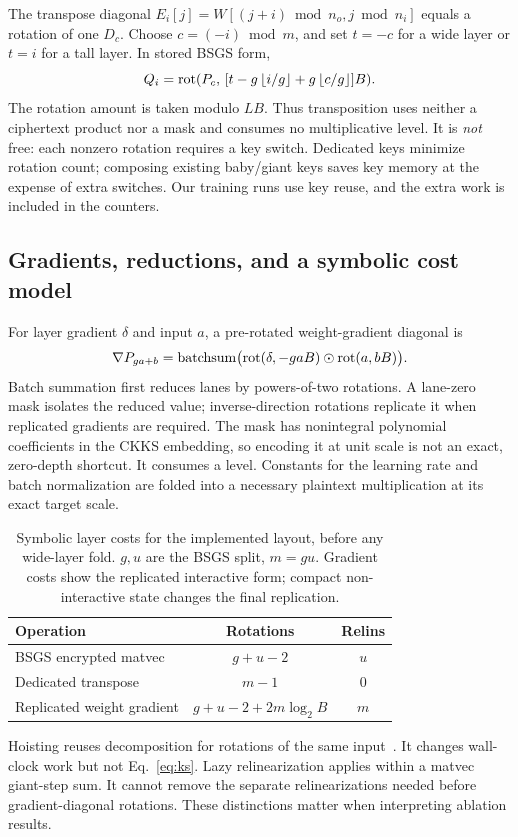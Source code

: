 The transpose diagonal $E_i[j]=W[(j+i)\bmod n_o,j\bmod n_i]$ equals a rotation of one $D_c$. Choose $c=(-i)\bmod m$, and set $t=-c$ for a wide layer or $t=i$ for a tall layer. In stored BSGS form,
\begin{equation}
 Q_i=\operatorname{rot}(P_c,\,[t-g\left\lfloor i/g\right\rfloor+g\left\lfloor c/g\right\rfloor]B).
 \label{eq:transpose}
\end{equation}
The rotation amount is taken modulo $LB$. Thus transposition uses neither a ciphertext product nor a mask and consumes no multiplicative level. It is \emph{not} free: each nonzero rotation requires a key switch. Dedicated keys minimize rotation count; composing existing baby/giant keys saves key memory at the expense of extra switches. Our training runs use key reuse, and the extra work is included in the counters.

\subsection{Gradients, reductions, and a symbolic cost model}
For layer gradient $\delta$ and input $a$, a pre-rotated weight-gradient diagonal is
\begin{equation}
 \nabla P_{ga+b}
 =\operatorname{batchsum}\bigl(\operatorname{rot}(\delta,-gaB)\odot\operatorname{rot}(a,bB)\bigr).
 \label{eq:gradient}
\end{equation}
Batch summation first reduces lanes by powers-of-two rotations. A lane-zero mask isolates the reduced value; inverse-direction rotations replicate it when replicated gradients are required. The mask has nonintegral polynomial coefficients in the CKKS embedding, so encoding it at unit scale is not an exact, zero-depth shortcut. It consumes a level. Constants for the learning rate and batch normalization are folded into a necessary plaintext multiplication at its exact target scale.

\begin{table}[t]
\centering\small
\caption{Symbolic layer costs for the implemented layout, before any wide-layer fold. $g,u$ are the BSGS split, $m=gu$. Gradient costs show the replicated interactive form; compact non-interactive state changes the final replication.}
\label{tab:symbolic}
\begin{tabular}{lcc}
\toprule
Operation & Rotations & Relins \\
\midrule
BSGS encrypted matvec & $g+u-2$ & $u$ \\
Dedicated transpose & $m-1$ & $0$ \\
Replicated weight gradient & $g+u-2+2m\log_2 B$ & $m$ \\
\bottomrule
\end{tabular}
\end{table}
Hoisting reuses decomposition for rotations of the same input~\cite{halevi2018}. It changes wall-clock work but not Eq.~\eqref{eq:ks}. Lazy relinearization applies within a matvec giant-step sum. It cannot remove the separate relinearizations needed before gradient-diagonal rotations. These distinctions matter when interpreting ablation results.

